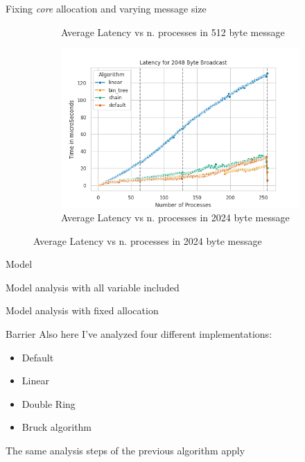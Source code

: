 \documentclass[11pt]{beamer}
\begin{document}
\begin{frame}{Fixing \textit{core} allocation and varying message size}
\begin{figure}[h]
\begin{subfigure}{0.45\textwidth}
			\caption{Average Latency vs n. processes in 512 byte message}
			\label{fig:bcastall512byte}
		\end{subfigure}
		\begin{subfigure}{0.45\textwidth}
			\centering
			\includegraphics[width=0.7\linewidth]{../exercise1/plots/bcast_all_2048byte}
			\caption{Average Latency vs n. processes in 2024 byte message}
			\label{fig:bcastall2048byte}
		\end{subfigure}
	\end{figure}
\end{frame}

\begin{frame}{Model}
	\begin{center}
		
	\end{center}
	Model analysis with all variable included %
\end{frame}
\begin{frame}
	\begin{center}
		
	\end{center}
	Model analysis with fixed allocation %
\end{frame}

\begin{frame}{Barrier}
	Also here I've analyzed four different implementations:
	\begin{itemize}
		\item Default
		\item Linear
		\item Double Ring
		\item Bruck algorithm
	\end{itemize}
	The same analysis steps of the previous algorithm apply
\end{frame}
\end{document}
